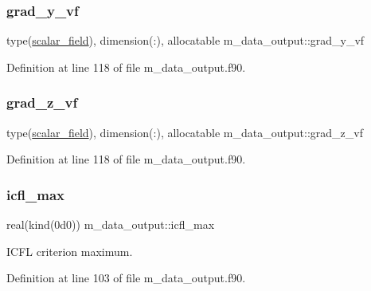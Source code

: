 \subsubsection{\texorpdfstring{grad\+\_\+y\+\_\+vf}{grad\_y\_vf}}
{\footnotesize\ttfamily type(\hyperlink{structm__derived__types_1_1scalar__field}{scalar\+\_\+field}), dimension(\+:), allocatable m\+\_\+data\+\_\+output\+::grad\+\_\+y\+\_\+vf}



Definition at line 118 of file m\+\_\+data\+\_\+output.\+f90.

\mbox{\label{namespacem__data__output_a5b33b9c60a91e08f0e67da2de15e7d6d}} 
\subsubsection{\texorpdfstring{grad\+\_\+z\+\_\+vf}{grad\_z\_vf}}
{\footnotesize\ttfamily type(\hyperlink{structm__derived__types_1_1scalar__field}{scalar\+\_\+field}), dimension(\+:), allocatable m\+\_\+data\+\_\+output\+::grad\+\_\+z\+\_\+vf}



Definition at line 118 of file m\+\_\+data\+\_\+output.\+f90.

\mbox{\label{namespacem__data__output_a08a5f85ca151336658398a0eccc93cb4}} 
\subsubsection{\texorpdfstring{icfl\+\_\+max}{icfl\_max}}
{\footnotesize\ttfamily real(kind(0d0)) m\+\_\+data\+\_\+output\+::icfl\+\_\+max}



I\+C\+FL criterion maximum. 



Definition at line 103 of file m\+\_\+data\+\_\+output.\+f90.

\mbox{\label{namespacem__data__output_a1ca202582d46c282b83b5510e6b6d626}} 

